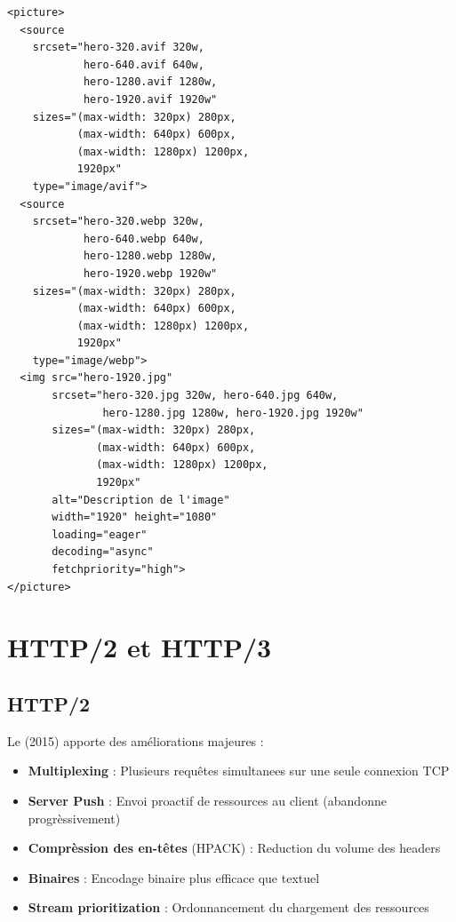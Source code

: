 \begin{lstlisting}[style=htmlcode,caption={Balise picture avec fallback et srcset optimisé}]
<picture>
  <source
    srcset="hero-320.avif 320w,
            hero-640.avif 640w,
            hero-1280.avif 1280w,
            hero-1920.avif 1920w"
    sizes="(max-width: 320px) 280px,
           (max-width: 640px) 600px,
           (max-width: 1280px) 1200px,
           1920px"
    type="image/avif">
  <source
    srcset="hero-320.webp 320w,
            hero-640.webp 640w,
            hero-1280.webp 1280w,
            hero-1920.webp 1920w"
    sizes="(max-width: 320px) 280px,
           (max-width: 640px) 600px,
           (max-width: 1280px) 1200px,
           1920px"
    type="image/webp">
  <img src="hero-1920.jpg"
       srcset="hero-320.jpg 320w, hero-640.jpg 640w,
               hero-1280.jpg 1280w, hero-1920.jpg 1920w"
       sizes="(max-width: 320px) 280px,
              (max-width: 640px) 600px,
              (max-width: 1280px) 1200px,
              1920px"
       alt="Description de l'image"
       width="1920" height="1080"
       loading="eager"
       decoding="async"
       fetchpriority="high">
</picture>
\end{lstlisting}

\section{HTTP/2 et HTTP/3}

\subsection{HTTP/2}

Le  (2015) apporte des améliorations majeures :

\begin{itemize}
    \item \textbf{Multiplexing} : Plusieurs requêtes simultanees sur une seule connexion TCP
    \item \textbf{Server Push} : Envoi proactif de ressources au client (abandonne progrèssivement)
    \item \textbf{Comprèssion des en-têtes} (HPACK) : Reduction du volume des headers
    \item \textbf{Binaires} : Encodage binaire plus efficace que textuel
    \item \textbf{Stream prioritization} : Ordonnancement du chargement des ressources
\end{itemize}

